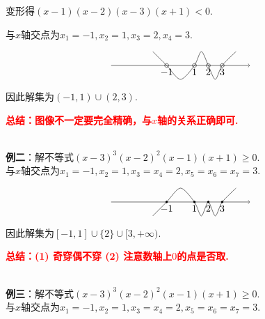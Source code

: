 \documentclass[8pt]{article}
\begin{document}
					变形得$(x-1)(x-2)(x-3)(x+1)<0.$

					与$x$轴交点为$x_1=-1, x_2=1, x_3=2, x_4=3.$

					$$
					\begin{tikzpicture}[scale=0.5]
				    		\draw[black, ->] (-5, 0)--(5, 0);
				    		\draw[black] (-1, 0) circle (4pt) node[anchor=north] {$-1$};
				    		\draw[black] ( 1, 0) circle (4pt) node[anchor=north] {$1$};
				    		\draw[black] ( 2, 0) circle (4pt) node[anchor=north] {$2$};
				    		\draw[black] ( 3, 0) circle (4pt) node[anchor=north] {$3$};
				    		\draw[black] plot [smooth] coordinates {(4, 1) (3, 0) (2.5, -1) (2, 0) (1.5, 1) (1, 0) (0, -1) (-1, 0) (-2, 1)};
				    	\end{tikzpicture}
					$$

					因此解集为$(-1, 1)\cup(2, 3).$

					\textcolor{red}{\textbf{总结：图像不一定要完全精确，与$x$轴的关系正确即可.}}

				~\\

				\textbf{例二}：解不等式$\displaystyle (x-3)^3 (x-2)^2 (x-1) (x+1) \geq 0.$
					~\\

					与$x$轴交点为$x_1=-1, x_2=1, x_3=x_4=2, x_5=x_6=x_7=3.$

					$$
					\begin{tikzpicture}[scale=0.5]
				    		\draw[black, ->] (-5, 0)--(5, 0);
				    		\filldraw[black] (-1, 0) circle (2pt) node[anchor=north] {$-1$};
				    		\filldraw[black] ( 1, 0) circle (2pt) node[anchor=north] {$1$};
				    		\filldraw[black] ( 2, 0) circle (2pt) node[anchor=north] {$2$};
				    		\filldraw[black] ( 3, 0) circle (2pt) node[anchor=north] {$3$};
				    		\draw[black] plot [smooth] coordinates {(4, 1) (3, 0) (2.5, -1) (2, 0) (1.5, -1) (1, 0) (0, 1) (-1, 0) (-2, -1)};
				    	\end{tikzpicture}
					$$

					因此解集为$[-1, 1]\cup\{2\}\cup[3, +\infty).$

					\textcolor{red}{\textbf{总结：(1) 奇穿偶不穿 (2) 注意数轴上$0$的点是否取.}}

				~\\

				\textbf{例三}：解不等式$\displaystyle (x-3)^3 (x-2)^2 (x-1) (x+1) \geq 0.$
					~\\

					与$x$轴交点为$x_1=-1, x_2=1, x_3=x_4=2, x_5=x_6=x_7=3.$
\end{document}
